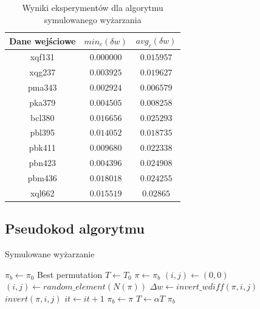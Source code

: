 \documentclass[12pt]{article}
\begin{document}
    \newpage

        \begin{table}[h!]
        \centering
        \begin{tabularx}{0.4225\textwidth}{| c | c | c |}
            \hline
            Dane wejściowe & $min_{c}(\delta{w})$ & $avg_{c}(\delta{w})$ \\
            \hline
            xqf131 & $0.000000$ & $0.015957$ \\
            xqg237 & $0.003925$ & $0.019627$ \\
            pma343 & $0.002924$ & $0.006579$ \\
            pka379 & $0.004505$ & $0.008258$ \\
            bcl380 & $0.016656$ & $0.025293$ \\
            pbl395 & $0.014052$ & $0.018735$ \\
            pbk411 & $0.009680$ & $0.022338$ \\
            pbn423 & $0.004396$ & $0.024908$ \\
            pbm436 & $0.018018$ & $0.024255$ \\
            xql662 & $0.015519$ & $0.02865$ \\
            \hline
        \end{tabularx}
        \label{table:sa_exp}
        \caption{Wyniki eksperymentów dla algorytmu symulowanego wyżarzania}
        \end{table}

    \noindent\newline

    \subsection{Pseudokod algorytmu}

        \begin{algorithm}[h!]
        \caption{Symulowane wyżarzanie}\label{alg:simulated_annealing}
        \begin{algorithmic}[1]
                \State $\pi_b \gets \pi_0$
                    \Comment Best permutation
                \State $T \gets T_0$
                \State
                    \State $\pi \gets \pi_b$
                    \State $(i, j) \gets (0, 0)$
                    \State
                        \State $(i, j) \gets random\_element(N(\pi))$
                        \State $\Delta{w} \gets invert\_wdiff(\pi, i, j)$
                            \State $invert(\pi, i, j)$
                            \State $it \gets it + 1$
                                \State $\pi_b \gets \pi$
                            \EndIf
                        \EndIf
                    \EndWhile
                    \State $T \gets \alpha T$
                \EndWhile
                \State
                \Return $\pi_b$
            \EndProcedure
        \end{algorithmic}
        \end{algorithm}
\end{document}

